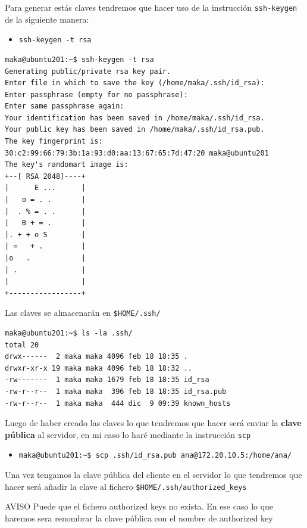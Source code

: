 \documentclass[11pt]{article}
\begin{document}
Para generar estás claves tendremos que hacer uso de la instrucción \texttt{ssh-keygen} de la siguiente manera:
\begin{itemize}
\item \texttt{ssh-keygen -t rsa}
\end{itemize}
\begin{verbatim}
maka@ubuntu201:~$ ssh-keygen -t rsa
Generating public/private rsa key pair.
Enter file in which to save the key (/home/maka/.ssh/id_rsa): 
Enter passphrase (empty for no passphrase): 
Enter same passphrase again: 
Your identification has been saved in /home/maka/.ssh/id_rsa.
Your public key has been saved in /home/maka/.ssh/id_rsa.pub.
The key fingerprint is:
30:c2:99:66:79:3b:1a:93:d0:aa:13:67:65:7d:47:20 maka@ubuntu201
The key's randomart image is:
+--[ RSA 2048]----+
|      E ...      |
|   o = . .       |
|  . % = . .      |
|   B + = .       |
|. + + o S        |
| =   + .         |
|o   .            |
| .               |
|                 |
+-----------------+
\end{verbatim}

Las claves se almacenarán en \texttt{\$HOME/.ssh/}
\begin{verbatim}
maka@ubuntu201:~$ ls -la .ssh/
total 20
drwx------  2 maka maka 4096 feb 18 18:35 .
drwxr-xr-x 19 maka maka 4096 feb 18 18:32 ..
-rw-------  1 maka maka 1679 feb 18 18:35 id_rsa
-rw-r--r--  1 maka maka  396 feb 18 18:35 id_rsa.pub
-rw-r--r--  1 maka maka  444 dic  9 09:39 known_hosts
\end{verbatim}

Luego de haber creado las claves lo que tendremos que hacer será enviar la \textbf{clave pública} al servidor, en mi caso lo haré mediante la instrucción \texttt{scp}
\begin{itemize}
\item \texttt{maka@ubuntu201:\textasciitilde{}\$ scp .ssh/id\_rsa.pub ana@172.20.10.5:/home/ana/}
\end{itemize}

Una vez tengamos la clave pública del cliente en el servidor lo que tendremos que hacer será añadir la clave al fichero \texttt{\$HOME/.ssh/authorized\_keys}


\begin{alertblock}{AVISO}
Puede que el fichero authorized keys no exista. En ese caso lo que haremos sera renombrar la clave pública con el nombre de authorized key
\end{alertblock}
\end{document}
